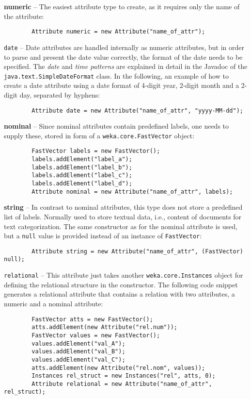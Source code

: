 \begin{tight_itemize}
	\item \textbf{numeric} -- The easiest attribute type to create, as it
requires only the name of the attribute:
	\begin{verbatim}
		Attribute numeric = new Attribute("name_of_attr");
	\end{verbatim}

	\item \texttt{date} -- Date attributes are handled internally as numeric
attributes, but in order to parse and present the date value correctly, the
format of the date needs to be specified. The \textit{date} and \textit{time
patterns} are explained in detail in the Javadoc of the
\texttt{java.text.SimpleDateFormat} class. In the following, an example of how
to create a date attribute using a date format of 4-digit year, 2-digit month
and a 2-digit day, separated by hyphens:
	\begin{verbatim}
		Attribute date = new Attribute("name_of_attr", "yyyy-MM-dd");
	\end{verbatim}

	\item \textbf{nominal} -- Since nominal attributes contain predefined
labels, one needs to supply these, stored in form of a
\texttt{weka.core.FastVector} object:
	\begin{verbatim}
		FastVector labels = new FastVector();
		labels.addElement("label_a");
		labels.addElement("label_b");
		labels.addElement("label_c");
		labels.addElement("label_d");
		Attribute nominal = new Attribute("name_of_attr", labels);
	\end{verbatim}

	\item \textbf{string} -- In contrast to nominal attributes, this type does
not store a predefined list of labels. Normally used to store textual data,
i.e., content of documents for text categorization. The same constructor as for
the nominal attribute is used, but a \texttt{null} value is provided instead of
an instance of \texttt{FastVector}:
	\begin{verbatim}
		Attribute string = new Attribute("name_of_attr", (FastVector) null);
	\end{verbatim}

	\newpage

	\item \texttt{relational} -- This attribute just takes another
\texttt{weka.core.Instances} object for defining the relational structure in
the constructor. The following code snippet generates a relational attribute
that contains a relation with two attributes, a numeric and a nominal attribute:
	\begin{verbatim}
		FastVector atts = new FastVector();
		atts.addElement(new Attribute("rel.num"));
		FastVector values = new FastVector();
		values.addElement("val_A");
		values.addElement("val_B");
		values.addElement("val_C");
		atts.addElement(new Attribute("rel.nom", values));
		Instances rel_struct = new Instances("rel", atts, 0);
		Attribute relational = new Attribute("name_of_attr", rel_struct);
	\end{verbatim}
\end{tight_itemize}
